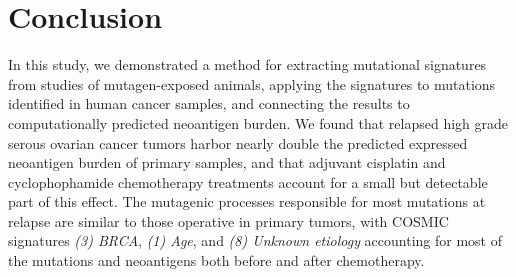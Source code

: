 \section*{Conclusion}
In this study, we demonstrated a method for extracting mutational signatures from studies of mutagen-exposed animals, applying the signatures to mutations identified in human cancer samples, and connecting the results to computationally predicted neoantigen burden. We found that relapsed high grade serous ovarian cancer tumors harbor nearly double the predicted expressed neoantigen burden of primary samples, and that adjuvant cisplatin and cyclophophamide chemotherapy treatments account for a small but detectable part of this effect. The mutagenic processes responsible for most mutations at relapse are similar to those operative in primary tumors, with COSMIC signatures \textit{(3) BRCA}, \textit{(1) Age}, and \textit{(8) Unknown etiology} accounting for most of the mutations and neoantigens both before and after chemotherapy.